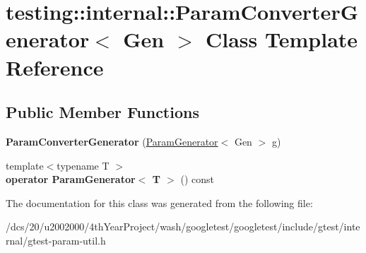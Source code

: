 \hypertarget{classtesting_1_1internal_1_1ParamConverterGenerator}{}\section{testing\+:\+:internal\+:\+:Param\+Converter\+Generator$<$ Gen $>$ Class Template Reference}
\label{classtesting_1_1internal_1_1ParamConverterGenerator}
\subsection*{Public Member Functions}
\begin{DoxyCompactItemize}
\item 
\mbox{\label{classtesting_1_1internal_1_1ParamConverterGenerator_ad1d62766d3e5aae0021c3649002c8782}} 
{\bfseries Param\+Converter\+Generator} (\mbox{\hyperlink{classtesting_1_1internal_1_1ParamGenerator}{Param\+Generator}}$<$ Gen $>$ g)
\item 
\mbox{\label{classtesting_1_1internal_1_1ParamConverterGenerator_af3f421e87a81f6021dfd1bd0538642e6}} 
{\footnotesize template$<$typename T $>$ }\\{\bfseries operator Param\+Generator$<$ T $>$} () const
\end{DoxyCompactItemize}


The documentation for this class was generated from the following file\+:\begin{DoxyCompactItemize}
\item 
/dcs/20/u2002000/4th\+Year\+Project/wash/googletest/googletest/include/gtest/internal/gtest-\/param-\/util.\+h\end{DoxyCompactItemize}
